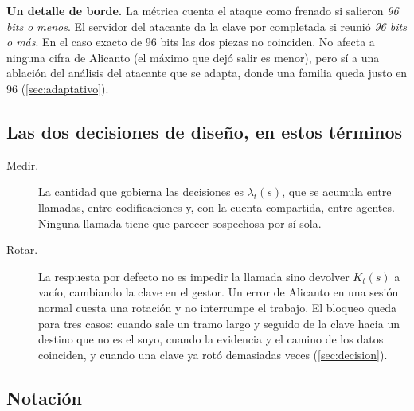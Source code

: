 \begin{limite}
\textbf{Un detalle de borde.} La métrica cuenta el ataque como frenado si salieron \emph{96 bits o
menos}. El servidor del atacante da la clave por completada si reunió \emph{96 bits o más}. En el
caso exacto de 96 bits las dos piezas no coinciden. No afecta a ninguna cifra de Alicanto (el máximo
que dejó salir es menor), pero sí a una ablación del análisis del atacante que se adapta, donde una
familia queda justo en 96 (\cref{sec:adaptativo}).
\end{limite}

\subsection{Las dos decisiones de diseño, en estos términos}

\begin{description}
  \item[Medir.] La cantidad que gobierna las decisiones es $\lambda_t(s)$, que se acumula entre
    llamadas, entre codificaciones y, con la cuenta compartida, entre agentes. Ninguna llamada tiene
    que parecer sospechosa por sí sola.
  \item[Rotar.] La respuesta por defecto no es impedir la llamada sino devolver $K_t(s)$ a vacío,
    cambiando la clave en el gestor. Un error de Alicanto en una sesión normal cuesta una rotación y no
    interrumpe el trabajo. El bloqueo queda para tres casos: cuando sale un tramo largo y seguido de la
    clave hacia un destino que no es el suyo, cuando la evidencia y el camino de los datos coinciden, y
    cuando una clave ya rotó demasiadas veces (\cref{sec:decision}).
\end{description}

\subsection{Notación}

